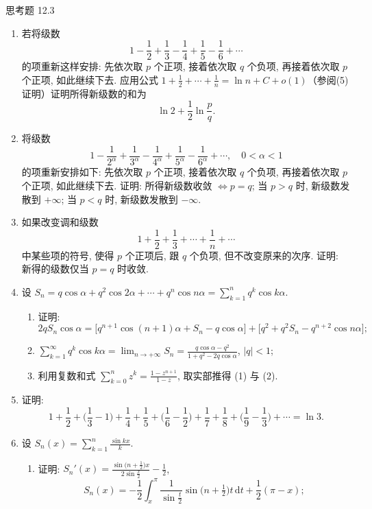 \begin{exblock}{思考题 12.3}
\begin{enumerate}
\begin{enumerate}
  \end{enumerate}
  \item 若将级数
  \[
    1-\frac{1}{2}+\frac{1}{3}-\frac{1}{4}+\frac{1}{5}-\frac{1}{6}+\cdots
\]
  的项重新这样安排: 先依次取 $p$ 个正项, 接着依次取 $q$ 个负项, 再接着依次取 $p$ 个正项, 如此继续下去. 应用公式
  $1+\frac{1}{2}+\cdots+\frac{1}{n}=\ln n+C+o(1)$（参阅(5) 证明）证明所得新级数的和为
  \[
    \ln 2+\frac{1}{2}\ln\frac{p}{q}.
\]
  \item 将级数
  \[
    1-\frac{1}{2^{\alpha}}+\frac{1}{3^{\alpha}}-\frac{1}{4^{\alpha}}
    +\frac{1}{5^{\alpha}}-\frac{1}{6^{\alpha}}+\cdots,\quad 0<\alpha<1
\]
  的项重新安排如下: 先依次取 $p$ 个正项, 接着依次取 $q$ 个负项, 再接着依次取 $p$ 个正项, 如此继续下去. 证明: 所得新级数收敛 $\Leftrightarrow p=q$; 当 $p>q$ 时, 新级数发散到 $+\infty$; 当 $p<q$ 时, 新级数发散到 $-\infty$.
  \item 如果改变调和级数
  \[
    1+\frac{1}{2}+\frac{1}{3}+\cdots+\frac{1}{n}+\cdots
\]
  中某些项的符号, 使得 $p$ 个正项后, 跟 $q$ 个负项, 但不改变原来的次序. 证明: 新得的级数仅当 $p=q$ 时收敛.
  \item 设 $S_{n}=q\cos\alpha+q^{2}\cos 2\alpha+\cdots+q^{n}\cos n\alpha
        =\sum_{k=1}^{n}q^{k}\cos k\alpha$.
  \begin{enumerate}
    \item 证明:
    \[
      2qS_{n}\cos\alpha
      =\bigl[q^{n+1}\cos(n+1)\alpha+S_{n}-q\cos\alpha\bigr]
      +\bigl[q^{2}+q^{2}S_{n}-q^{n+2}\cos n\alpha\bigr];
\]
    \item $\displaystyle\sum_{k=1}^{\infty}q^{k}\cos k\alpha
          =\lim_{n\to+\infty}S_{n}
          =\frac{q\cos\alpha-q^{2}}{1+q^{2}-2q\cos\alpha}$, $|q|<1$;
    \item 利用复数和式 $\displaystyle\sum_{k=0}^{n}z^{k}=\frac{1-z^{n+1}}{1-z}$,
          取实部推得 (1) 与 (2).
  \end{enumerate}
  \item 证明:
  \[
    1+\frac{1}{2}+\biggl(\frac{1}{3}-1\biggr)+\frac{1}{4}+\frac{1}{5}
    +\biggl(\frac{1}{6}-\frac{1}{2}\biggr)+\frac{1}{7}+\frac{1}{8}
    +\biggl(\frac{1}{9}-\frac{1}{3}\biggr)+\cdots=\ln 3.
\]
  \item 设 $S_{n}(x)=\sum_{k=1}^{n}\frac{\sin kx}{k}$.
  \begin{enumerate}
    \item 证明: $\displaystyle S_{n}'(x)=\frac{\sin\bigl(n+\frac{1}{2}\bigr)x}{2\sin\frac{x}{2}}-\frac{1}{2}$,
    \[
      S_{n}(x)=-\frac{1}{2}\int_{x}^{\pi}\frac{1}{\sin\frac{t}{2}}
      \sin\bigl(n+\tfrac{1}{2}\bigr)t\,\mathrm{d}t+\frac{1}{2}(\pi-x);
\]
\end{enumerate}
\end{enumerate}
\end{exblock}
